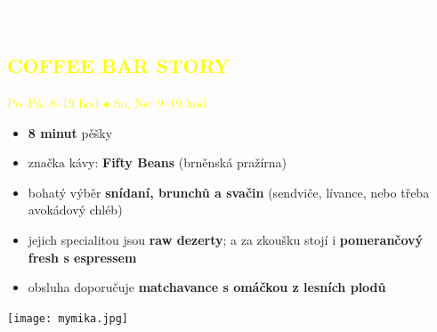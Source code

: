 \documentclass[a5paper, twoside]{article}
\newcommand{\polonadpis}[4]{
  \vspace*{-50pt}
  \begin{tcolorbox}[colback = #2, boxrule = 0pt, grow to left by = #4,  grow to right by = #4, arc=8pt, height = 30pt]
    \vspace*{5pt}
    \centering \subsection*{\textcolor{#3}{#1}}
  \end{tcolorbox}
}
\newcommand{\podnadpis}[2]{
  \subsection*{\textcolor{#2}{#1}}
}
\begin{document}
\pagebreak
\polonadpis{IV. Za hranicemi školy}{yellow}{white}{-3.8cm}

\noindent
\begin{minipage}{0.7\textwidth}
	\podnadpis{COFFEE BAR STORY}{yellow}
	\textcolor{yellow}{Po--Pá: 8--19 hod $\bullet$ So, Ne: 9--19 hod}
	\vspace{5pt}
	\small
	\begin{itemize}[leftmargin=10pt]
		\item \textbf{8 minut} pěšky
		\item značka kávy: \textbf{Fifty Beans} (brněnská pražírna)
		\item bohatý výběr \textbf{snídaní, brunchů a svačin} (sendviče, lívance, nebo třeba avokádový chléb)
		\item jejich specialitou jsou \textbf{raw dezerty}; a za zkoušku stojí i \textbf{pomerančový fresh s espressem} 
		\item obsluha doporučuje \textbf{matchavance s omáčkou z lesních plodů}
	\end{itemize}
\end{minipage}
\hfill
\begin{minipage}{0.27\textwidth}
	\texttt{[image: mymika.jpg]}
\end{minipage}
\end{document}

